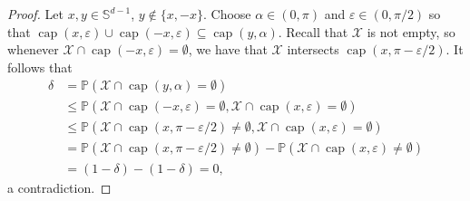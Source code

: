 \documentclass[12pt,a4paper]{article}
\theoremstyle{definition}
\renewcommand{\P}{\mathbb{P}}
\DeclareMathOperator{\capop}{cap}
\begin{document}
\begin{proof}
Let \(x,y \in \mathbb{S}^{d-1}\), \(y \notin \{x,-x\}\).
Choose \(\alpha \in (0,\pi)\) and \(\varepsilon\in(0,\pi/2)\) so that \(\capop(x,\varepsilon) \cup \capop(-x,\varepsilon) \subseteq  \capop(y,\alpha)\).
Recall that \(\mathcal X\) is not empty, so whenever \(\mathcal X \cap \capop(-x,\varepsilon) = \emptyset\), we have that \(\mathcal X\) intersects \(\capop(x,\pi-\varepsilon/2)\).
It follows that
\begin{align*}
    \delta
    &= \P(\mathcal X \cap \capop(y,\alpha) = \emptyset)\\
    &\leq \P(\mathcal X \cap \capop(-x,\varepsilon) = \emptyset, \mathcal X \cap \capop(x,\varepsilon) = \emptyset)\\
    &\leq \P(\mathcal X \cap \capop(x,\pi-\varepsilon/2) \neq \emptyset, \mathcal X \cap \capop(x,\varepsilon) = \emptyset)\\
    &= \P(\mathcal X \cap \capop(x,\pi-\varepsilon/2) \neq \emptyset) - \P(\mathcal X \cap \capop(x,\varepsilon) \neq \emptyset)\\
    &= (1-\delta) - (1-\delta) = 0,
\end{align*}
a contradiction. 

\end{proof}
\end{document}
